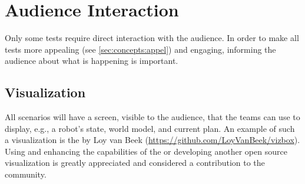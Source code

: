 \section{Audience Interaction}
\label{sec:rules:audience}
Only some tests require direct interaction with the audience. In order to make all tests more appealing (see \ref{sec:concepts:appel}) and engaging, informing the audience about what is happening is important.

\subsection{Visualization}
\label{sec:rules:audience:visualization}
All scenarios will have a screen, visible to the audience, that the teams can use to display, e.g., a robot's state, world model, and current plan. An example of such a visualization is the \VizBox{} by Loy van Beek (\url{https://github.com/LoyVanBeek/vizbox}). Using and enhancing the capabilities of the \VizBox{} or developing another open source visualization is greatly appreciated and considered a contribution to the \RoboCup\AtHome{} community.